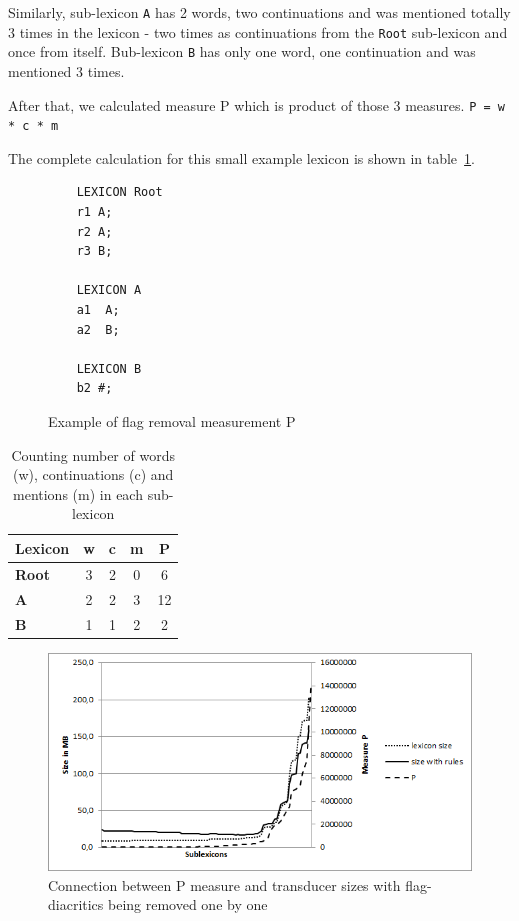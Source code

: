 \documentclass[10pt, a4paper]{article}
\begin{document}
Similarly, sub-lexicon \verb+A+ has 2 words, two continuations and was mentioned totally 3 times in the lexicon - 
two times as continuations from the \verb+Root+ sub-lexicon and once from itself. Bub-lexicon \verb+B+ has only one word, one continuation and was mentioned 3 times. 

After that, we calculated measure P which is product of 
those 3 measures.
\verb+P = w * c * m+

The complete calculation for this small example lexicon is shown in table~\ref{table:measureP}.

\begin{figure}
\centering
\begin{verbatim}
    LEXICON Root
    r1 A;
    r2 A;
    r3 B;
    
    LEXICON A
    a1  A;
    a2  B;
    
    LEXICON B
    b2 #;
    \end{verbatim}
  
    \caption{Example of flag removal measurement P
    \label{fig:lexc-measures}}
\end{figure}

\begin{table}
    \centering
    \begin{tabular}{|l|c|c|c|c|}
        \hline
        \bf Lexicon & \bf w & \bf c & \bf m & \bf P \\
        \hline\hline
        \bf Root & 3 & 2 & 0 & 6  \\
        \bf A & 2 & 2 & 3 & 12 \\
        \bf B  & 1 & 1 & 2 & 2 \\
        \hline
    \end{tabular}
    \caption{Counting number of words (w), continuations (c) and mentions (m) in each sub-lexicon
    \label{table:measureP}}
\end{table}



\begin{figure}
    \includegraphics[width=\textwidth]{p-measure.png}
     \caption{Connection between P measure and transducer sizes with flag-diacritics being removed one by one
     \label{fig:p-measure-sizes}}
\end{figure}
\end{document}
